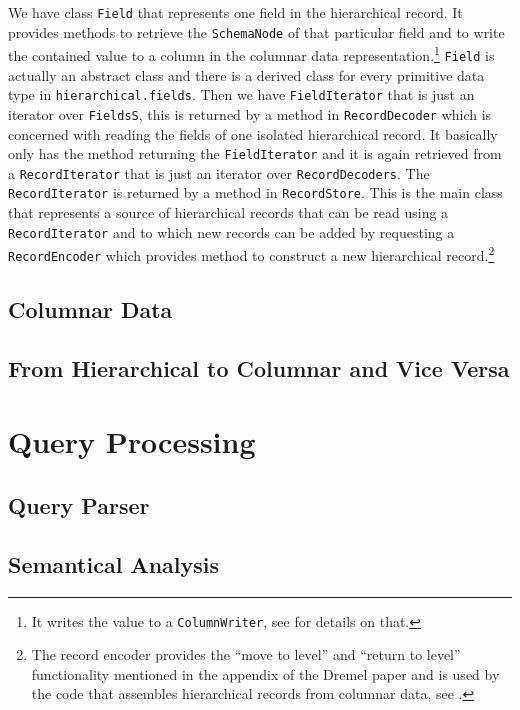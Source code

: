 We have class \texttt{Field} that represents one field in the hierarchical
record. It provides methods to retrieve the \texttt{SchemaNode} of that
particular field and to write the contained value to a column in
the columnar data representation.\footnote{It writes the value to a
\texttt{ColumnWriter}, see  for details on that.} \texttt{Field}
is actually an abstract class and there is a derived class for every
primitive data type in \texttt{hierarchical.fields}.
Then we have \texttt{FieldIterator} that is just an iterator over
\texttt{FieldsS}, this is returned by a method in \texttt{RecordDecoder}
which is concerned with reading the fields of one isolated hierarchical record.
It basically only has the method returning the \texttt{FieldIterator}
and it is again retrieved from a \texttt{RecordIterator} that is just
an iterator over \texttt{RecordDecoders}. The \texttt{RecordIterator}
is returned by a method in \texttt{RecordStore}. This is the main class
that represents a source of hierarchical records that can be read using
a \texttt{RecordIterator} and to which new records can be added by requesting
a \texttt{RecordEncoder} which provides method to construct a new hierarchical
record.\footnote{The record encoder provides the ``move to level'' and
``return to level'' functionality mentioned in the appendix of the Dremel
paper \cite{melnik2010dremel} and is used by the code that assembles
hierarchical records from columnar data, see .}

\subsection{Columnar Data}
\label{sec:columnar}

\subsection{From Hierarchical to Columnar and Vice Versa}
\label{sec:transform}


\section{Query Processing}

\subsection{Query Parser}

\subsection{Semantical Analysis}

